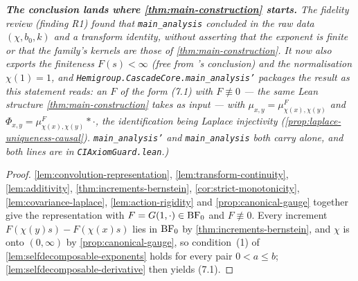 \begin{theorem}
\emph{\textbf{The conclusion lands where \ref{thm:main-construction} starts.} The fidelity
review (finding R1) found that \texttt{main\_analysis} concluded in the raw data $(\chi, b_0, k)$
and a transform identity, without asserting that the exponent is finite or that the family's
kernels \emph{are} those of \ref{thm:main-construction}. It now also exports the finiteness
$F(s) < \infty$ (free from 's conclusion) and the normalisation $\chi(1) = 1$, and
\texttt{Hemigroup.CascadeCore.main\_analysis'} packages the result as this statement reads: an
$F$ of the form (7.1) with $F \not\equiv 0$ --- the same Lean structure
\ref{thm:main-construction} takes as input --- with $\mu_{x,y} = \mu^F_{\chi(x),\chi(y)}$ and
$\Phi_{x,y} = \mu^F_{\chi(x),\chi(y)} * \cdot$, the identification being Laplace injectivity
(\ref{prop:laplace-uniqueness-causal}). \texttt{main\_analysis'} and \texttt{main\_analysis}
both carry  alone, and both lines are in \texttt{CIAxiomGuard.lean}.)}
\end{theorem}

\begin{proof}
\leanok
\ref{lem:convolution-representation}, \ref{lem:transform-continuity}, \ref{lem:additivity},
\ref{thm:increments-bernstein}, \ref{cor:strict-monotonicity}, \ref{lem:covariance-laplace},
\ref{lem:action-rigidity} and \ref{prop:canonical-gauge} together give the representation with
$F = G(1,\cdot) \in \mathrm{BF}_0$ and $F \not\equiv 0$. Every increment
$F(\chi(y)s) - F(\chi(x)s)$ lies in $\mathrm{BF}_0$ by \ref{thm:increments-bernstein}, and $\chi$ is
onto $(0,\infty)$ by \ref{prop:canonical-gauge}, so condition~(1) of
\ref{lem:selfdecomposable-exponents} holds for every pair $0 < a \le b$;
\ref{lem:selfdecomposable-derivative} then yields (7.1).
\end{proof}

